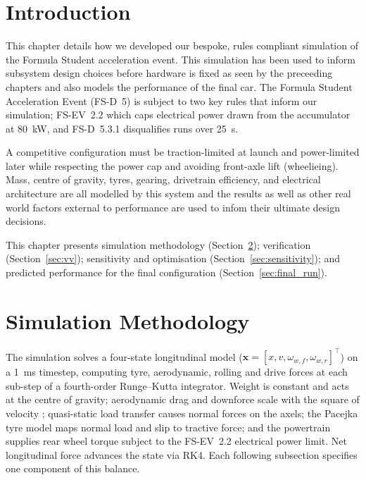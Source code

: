 \documentclass[11pt, a4paper]{report}
\numberwithin{equation}{section}
\begin{document}
\begin{refsection}
\graphicspath{{../HarryEmes/Engineering/}{../../figures/}}

\section{Introduction}
\label{sec:intro}

This chapter details how we developed our bespoke, rules compliant simulation of the Formula Student acceleration event. This simulation has been used to inform subsystem design choices before hardware is fixed as seen by the preceeding chapters and also models the performance of the final car.
The Formula Student Acceleration Event (FS-D~5) is subject to two key rules that inform our simulation; FS-EV~2.2 which caps electrical power drawn from the
accumulator at \SI{80}{\kilo\watt}, and FS-D~5.3.1 disqualifies runs
over \SI{25}{\second}. 

A competitive configuration must be
traction-limited at launch and power-limited later while respecting
the power cap and avoiding front-axle lift (wheelieing). Mass, centre of gravity,
tyres, gearing, drivetrain efficiency, and electrical architecture are
all modelled by this system and the results as well as other real world factors external to performance are used to infom their ultimate design decisions.

This chapter presents simulation methodology
(Section~\ref{sec:methodology}); verification
(Section~\ref{sec:vv}); sensitivity and optimisation
(Section~\ref{sec:sensitivity}); and predicted performance for the
final configuration (Section~\ref{sec:final_run}).

\section{Simulation Methodology}
\label{sec:methodology}

The simulation solves a four-state longitudinal model
($\mathbf{x} = [x, v, \omega_{w,f}, \omega_{w,r}]^\top$) on a
\SI{1}{\milli\second} timestep, computing tyre, aerodynamic, rolling
and drive forces at each sub-step of a fourth-order Runge--Kutta
integrator. Weight is constant and acts at the centre of gravity; aerodynamic drag and
downforce scale with the square of velocity ; quasi-static load transfer causes normal forces on the axels; the Pacejka tyre model maps normal load and slip to
tractive force; and the powertrain supplies rear wheel torque subject to
the FS-EV~2.2 electrical power limit. Net longitudinal force advances the
state via RK4. Each following subsection specifies one component of this
balance.


\end{refsection}
\end{document}

